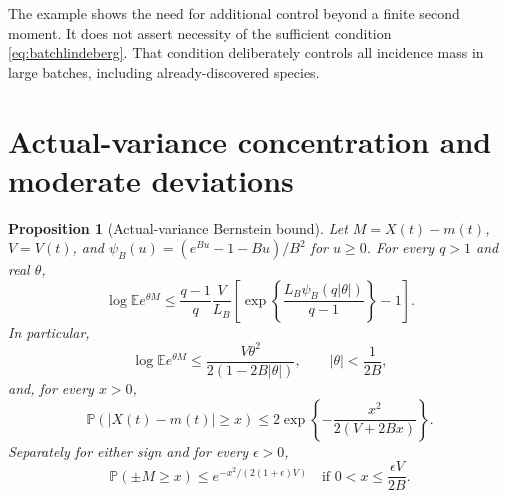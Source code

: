 \documentclass[11pt]{article}
\numberwithin{equation}{section}
\newtheorem{proposition}[theorem]{Proposition}
\theoremstyle{definition}
\theoremstyle{remark}
\newcommand{\E}{\mathbb E}
\newcommand{\Pp}{\mathbb P}
\begin{document}
The example shows the need for additional control beyond a finite second
moment. It does not assert necessity of the sufficient condition
\eqref{eq:batchlindeberg}. That condition deliberately controls all incidence
mass in large batches, including already-discovered species.

\section{Actual-variance concentration and moderate deviations}\label{sec:MDP}

\begin{proposition}[Actual-variance Bernstein bound]\label{prop:actualmgf}
Let $M=X(t)-m(t)$, $V=V(t)$, and
$\psi_B(u)=(e^{Bu}-1-Bu)/B^2$ for $u\ge0$. For every $q>1$ and real $\theta$,
\begin{equation}\label{eq:holdermgf}
 \log\E e^{\theta M}
 \le\frac{q-1}{q}\frac V{L_B}
 \left[\exp\left\{\frac{L_B\psi_B(q|\theta|)}{q-1}\right\}-1\right].
\end{equation}
In particular,
\begin{equation}\label{eq:smallmgf}
 \log\E e^{\theta M}\le
 \frac{V\theta^2}{2(1-2B|\theta|)},\qquad |\theta|<\frac1{2B},
\end{equation}
and, for every $x>0$,
\begin{equation}\label{eq:actualconcentration}
 \Pp(|X(t)-m(t)|\ge x)
 \le2\exp\left\{-\frac{x^2}{2(V+2Bx)}\right\}.
\end{equation}
Separately for either sign and for every $\epsilon>0$,
\begin{equation}\label{eq:neargaussian}
 \Pp(\pm M\ge x)\le
 e^{-x^2/(2(1+\epsilon)V)}
 \quad\text{if }0<x\le\frac{\epsilon V}{2B}.
\end{equation}
\end{proposition}
\end{document}
